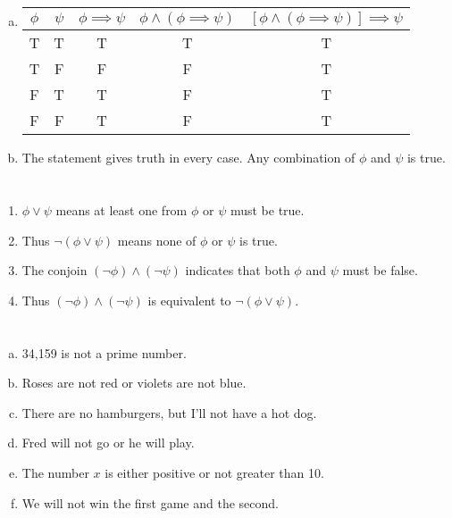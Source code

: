 \documentclass{article}
\begin{document}
\section{}

\begin{enumerate}[(a)]
\item
  \begin{tabular}{ | c | c | c | c | c | }
    \hline
    $\phi$ & $\psi$ & $\phi \implies \psi$ & $\phi \wedge (\phi \implies \psi)$ & $[\phi \wedge (\phi \implies \psi)] \implies \psi$ \\
    \hline
    T & T & T & T & T \\
    T & F & F & F & T \\
    F & T & T & F & T \\
    F & F & T & F & T \\
    \hline
  \end{tabular}
\item
  The statement gives truth in every case. Any combination of $\phi$ and $\psi$ is true.
\end{enumerate}

\section{}

\begin{enumerate}
\item $\phi \vee \psi$ means at least one from $\phi$ or $\psi$ must be true.
\item Thus $\neg(\phi \vee \psi)$ means none of $\phi$ or $\psi$ is true.
\item The conjoin $(\neg\phi) \wedge (\neg\psi)$ indicates that both $\phi$ and
  $\psi$ must be false.
\item Thus $(\neg\phi) \wedge (\neg\psi)$ is equivalent to $\neg(\phi \vee \psi)$.
\end{enumerate}

\section{}

\begin{enumerate}[(a)]
\item 34,159 is not a prime number.
\item Roses are not red or violets are not blue.
\item There are no hamburgers, but I'll not have a hot dog.
\item Fred will not go or he will play.
\item The number $x$ is either positive or not greater than 10.
\item We will not win the first game and the second.
\end{enumerate}
\end{document}
